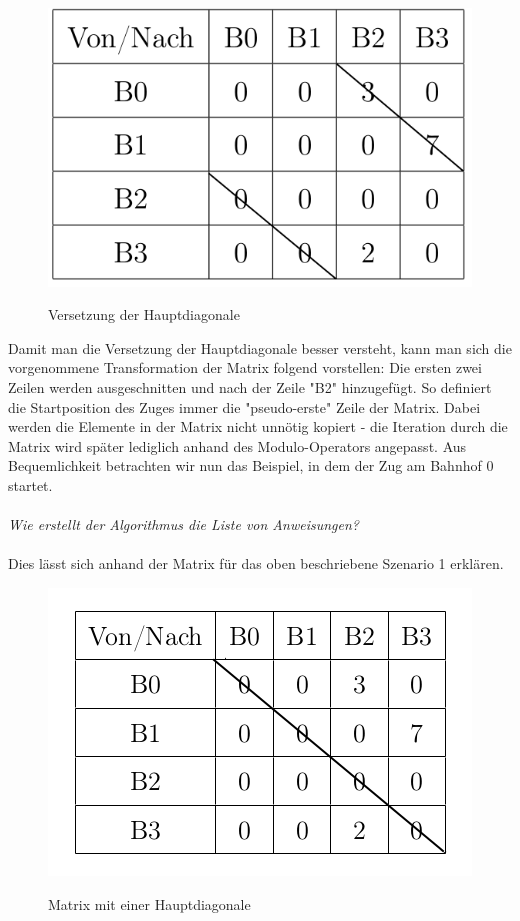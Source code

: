 \\
\begin{figure}[H]	
\caption{Versetzung der Hauptdiagonale}
\includegraphics[width=2\textwidth, width=280pt]{content/images/matrix2.png}
\label{pic:DiagonaleVersetzt}
\end{figure}
Damit man die Versetzung der Hauptdiagonale besser versteht, kann man sich die vorgenommene Transformation der Matrix folgend vorstellen: Die ersten zwei Zeilen werden ausgeschnitten und nach der Zeile "B2" hinzugefügt. So definiert die Startposition des Zuges immer die "pseudo-erste" Zeile der Matrix. Dabei werden die Elemente in der Matrix nicht unnötig kopiert - die Iteration durch die Matrix wird später lediglich anhand des Modulo-Operators angepasst. Aus Bequemlichkeit betrachten wir nun das Beispiel, in dem der Zug am Bahnhof 0 startet.\\
\\
\textit{Wie erstellt der Algorithmus die Liste von Anweisungen?\\}
\\
Dies lässt sich anhand der Matrix für das oben beschriebene Szenario 1 erklären.\\
\begin{figure}[H]	
\caption{Matrix mit einer Hauptdiagonale}
\includegraphics[width=2\textwidth, width=330pt]{content/images/matrix.png}
\label{pic:Hauptdiagonale}
\end{figure}
